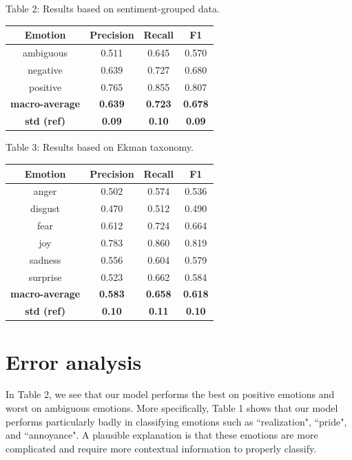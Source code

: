 \documentclass{article}
\begin{document}
\begin{minipage}[c]{0.55\textwidth}
{Table 2: Results based on sentiment-grouped data.}
\centering
\begin{tabular}{c c c c}
\hline\hline
Emotion & Precision & Recall & F1 \\ [0.5ex]
\hline 
ambiguous & 0.511 & 0.645 & 0.570\\
negative & 0.639 & 0.727 & 0.680\\
positive & 0.765 & 0.855 & 0.807\\
\textbf{macro-average} & \textbf{ 0.639 } & \textbf{ 0.723 } & \textbf{ 0.678 } \\ 
\textbf{std (ref)} & \textbf{0.09} & \textbf{0.10} & \textbf{0.09}\\[1ex] 
\hline 
\end{tabular}

\vspace{20ex}

{Table 3: Results based on Ekman taxonomy.}
\centering
\begin{tabular}{c c c c}
\hline\hline
Emotion & Precision & Recall & F1 \\ [0.5ex]
\hline 
anger & 0.502 & 0.574 & 0.536\\
disgust & 0.470 & 0.512 & 0.490\\
fear & 0.612 & 0.724 & 0.664\\
joy & 0.783 & 0.860 & 0.819\\
sadness & 0.556 & 0.604 & 0.579\\
surprise & 0.523 & 0.662 & 0.584\\
\textbf{macro-average} & \textbf{ 0.583 } & \textbf{ 0.658 } & \textbf{ 0.618 } \\ 
\textbf{std (ref)} & \textbf{0.10} & \textbf{0.11} & \textbf{0.10}\\[1ex] 
\hline 
\end{tabular}
\end{minipage}



\section{Error analysis}
In Table 2, we see that our model performs the best on positive emotions and worst on ambiguous emotions. More specifically, Table 1 shows that our model performs particularly badly in classifying emotions such as ``realization", ``pride", and ``annoyance". A plausible explanation is that these emotions are more complicated and require more contextual information to properly classify. 
\end{document}
